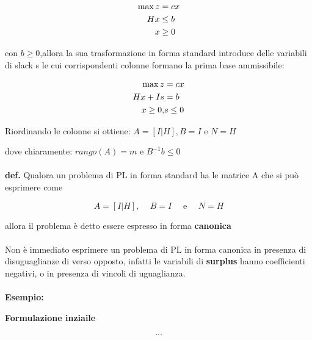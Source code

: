 \documentclass[a4paper, 11pt]{article}
\begin{document}
        \begin{align}
            \max{z} &= cx \notag \\
            Hx &\leq b \notag \\
            x &\geq 0 \notag 
        \end{align}

        con $b \geq 0$,allora la sua trasformazione in forma standard introduce delle variabili di slack s le cui corrispondenti colonne formano la prima base ammissibile: 

        \begin{align}
            \max{z} &= cx \notag \\
            Hx + Is & = b \notag \\
            x \geq 0, &s \leq 0 \notag 
        \end{align}

        Riordinando le colonne si ottiene: $A = [I | H], B = I$ e $N = H$

        dove chiaramente: $rango(A) = m$ e $B^{-1}b \le 0$

        \paragraph{}
        \textbf{def. }  Qualora un problema di PL in forma standard ha le matrice A che si può esprimere come

        $$
            A = [I | H] \text{, } \quad B = I \quad \text{ e }\quad N = H
        $$

        allora il problema è detto essere espresso in forma \textbf{canonica}

        \paragraph{}
        Non è immediato esprimere un problema di PL in forma canonica in presenza di disuguaglianze di verso opposto, infatti le variabili di \textbf{surplus} hanno coefficienti negativi, o in presenza di vincoli di uguaglianza.


        \paragraph{}
        \textbf{Esempio: }

        \textbf{Formulazione inziaile}

        \begin{align}
            ...
        \end{align}
\end{document}

